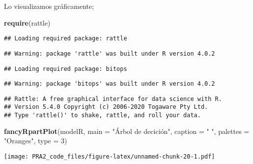 \documentclass[
]{article}
\newenvironment{Shaded}{\begin{snugshade}}{\end{snugshade}}
\newcommand{\DataTypeTok}[1]{\textcolor[rgb]{0.13,0.29,0.53}{#1}}
\newcommand{\KeywordTok}[1]{\textcolor[rgb]{0.13,0.29,0.53}{\textbf{#1}}}
\newcommand{\NormalTok}[1]{#1}
\newcommand{\StringTok}[1]{\textcolor[rgb]{0.31,0.60,0.02}{#1}}
\begin{document}
Lo visualizamos gráficamente;

\begin{Shaded}
\begin{Highlighting}[]
\KeywordTok{require}\NormalTok{(rattle)}
\end{Highlighting}
\end{Shaded}

\begin{verbatim}
## Loading required package: rattle
\end{verbatim}

\begin{verbatim}
## Warning: package 'rattle' was built under R version 4.0.2
\end{verbatim}

\begin{verbatim}
## Loading required package: bitops
\end{verbatim}

\begin{verbatim}
## Warning: package 'bitops' was built under R version 4.0.2
\end{verbatim}

\begin{verbatim}
## Rattle: A free graphical interface for data science with R.
## Version 5.4.0 Copyright (c) 2006-2020 Togaware Pty Ltd.
## Type 'rattle()' to shake, rattle, and roll your data.
\end{verbatim}

\begin{Shaded}
\begin{Highlighting}[]
\KeywordTok{fancyRpartPlot}\NormalTok{(modelR, }\DataTypeTok{main =} \StringTok{"Árbol de decición", caption = "} \StringTok{", palettes = "}\NormalTok{Oranges}\StringTok{", type = 3)}
\end{Highlighting}
\end{Shaded}

\texttt{[image: PRA2\_code\_files/figure-latex/unnamed-chunk-20-1.pdf]}
\end{document}
